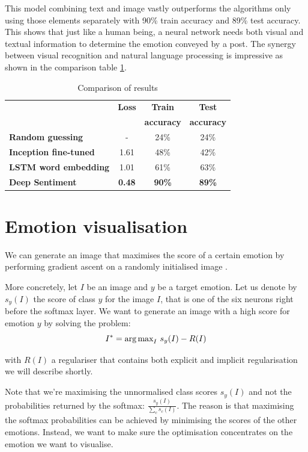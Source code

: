 This model combining text and image vastly outperforms the algorithms only using those elements separately with 90\% train accuracy and 89\% test accuracy. This shows that just like a human being, a neural network needs both visual and textual information to determine the emotion conveyed by a post. The synergy between visual recognition and natural language processing is impressive as shown in the comparison table \ref{all-results}.

\begin{table}[H]
\begin{center}
    \begin{tabular}{| l | c | c | c |}
    \hline
    & \textbf{Loss} & \textbf{Train} & \textbf{Test} \\
    & & \textbf{accuracy} & \textbf{accuracy} \\ \hline
    \textbf{Random guessing} & - & 24\% & 24\% \\ \hline
    \textbf{Inception fine-tuned}  & 1.61 & 48\% & 42\% \\ \hline
    \textbf{LSTM word embedding} & 1.01 & 61\% & 63\% \\ \hline
    \textbf{Deep Sentiment} & \textbf{0.48} & \textbf{90\%} & \textbf{89\%} \\
    \hline
    \end{tabular}
\end{center} 
\caption{Comparison of results}
\label{all-results}
\end{table}

\newpage
\section{Emotion visualisation}
We can generate an image that maximises the score of a certain emotion by performing gradient ascent on a randomly initialised image \cite{class-vis}.

More concretely, let $I$ be an image and $y$ be a target emotion. Let us denote by $s_y(I)$ the score of class $y$ for the image $I$, that is one of the six neurons right before the softmax layer. We want to generate an image with a high score for emotion $y$ by solving the problem:
\begin{equation}
I^* = \text{arg\,max}_I ~s_y(I) - R(I)
\end{equation}

with $R(I)$ a regulariser that contains both explicit and implicit regularisation we will describe shortly.

Note that we're maximising the unnormalised class scores $s_y(I)$ and not the probabilities returned by the softmax: $\frac{s_y(I)}{\sum_c s_c(I)}$. The reason is that maximising the softmax probabilities can be achieved by minimising the scores of the other emotions. Instead, we want to make sure the optimisation concentrates on the emotion we want to visualise. 

